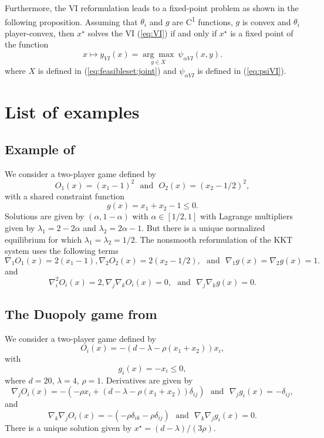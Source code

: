 \documentclass[11pt, a4paper]{article}
\newcommand{\txtm}[1]{\textrm{~~#1~~}}
\newcommand{\expo}{\textsuperscript}
\begin{document}
Furthermore, the VI reformulation leads to a fixed-point problem as shown in the following proposition.
Assuming that $\theta_i$ and $g$ are C\expo{1} functions, $g$ is convex and $\theta_i$ player-convex, then $x^\star$ solves the VI (\ref{eq:VI}) if and only if $x^\star$ is a fixed point of the function 
\begin{equation}
x \mapsto y_{VI}(x) = \underset{y\in X}{\arg\max}~ \psi_{\alpha VI}(x, y).
\label{eq:fpVIa:joint}
\end{equation}
where $X$ is defined in (\ref{eq:feasibleset:joint}) and $\psi_{\alpha VI}$ is defined in (\ref{eq:psiVI}).







\section{List of examples}

\subsection{Example of \cite{facchineietal07}}
We consider a two-player game defined by 
$$
O_1(x) = (x_1-1)^2 
\txtm{and}
O_2(x) = (x_2-1/2)^2,  
$$
with a shared constraint function
$$
g(x) = x_1 + x_2 - 1 \leq 0.
$$
Solutions are given by $(\alpha, 1-\alpha)$ with $\alpha \in [1/2, 1]$ with Lagrange multipliers given by $\lambda_1 = 2 - 2\alpha$ and $\lambda_2 = 2\alpha - 1$.
But there is a unique normalized equilibrium for which $\lambda_1=\lambda_2=1/2$.
The nonsmooth reformulation of the KKT system uses the following terms
$$
\nabla_1 O_1(x) = 2(x_1-1),
\nabla_2 O_2(x) = 2(x_2-1/2),
\txtm{and}
\nabla_1 g(x) = \nabla_2 g(x) = 1.
$$
and 
$$
\nabla_i^2 O_i(x) = 2,
\nabla_j \nabla_k O_i(x) = 0,
\txtm{and}
\nabla_j \nabla_k g(x) = 0.
$$

\subsection{The Duopoly game from \cite{krawuryasev00}}
We consider a two-player game defined by 
$$
O_i(x) = - (d- \lambda -\rho(x_1+x_2))x_i,
$$
with 
$$
g_i(x) = -x_i \leq 0,
$$
where $d = 20$, $\lambda = 4$, $\rho = 1$.
Derivatives are given by
$$
\nabla_j O_i(x) = -( -\rho x_i + (d- \lambda -\rho(x_1+x_2))\delta_{ij} )
\txtm{and}
\nabla_j g_i(x) = - \delta_{ij},
$$
and
$$
\nabla_k \nabla_j O_i(x) = -( -\rho \delta_{ik} - \rho\delta_{ij})
\txtm{and}
\nabla_k \nabla_j g_i(x) = 0.
$$
There is a unique solution given by $x^\star = (d-\lambda)/(3\rho)$.
\end{document}
